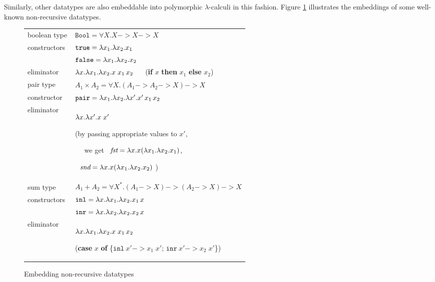 Similarly, other datatypes are also embeddable into
polymorphic $\lambda$-calculi in this fashion.
Figure \ref{fig:churchnonrec} illustrates the embeddings of
some well-known non-recursive datatypes.
\begin{figure}
\begin{tabular}{lp{60mm}}
boolean type	& $\!\!\!\!\mathtt{Bool} = \forall X.X -> X -> X$ \\
constructors		& $\mathtt{true} = \lambda x_1.\lambda x_2. x_1$ \\
            &$\mathtt{false} = \lambda x_1.\lambda x_2. x_2$ \\
eliminator		& $\lambda x.\lambda x_1. \lambda x_2. x\;x_1\,x_2$ \quad~~
	(\textbf{if} $x$ \textbf{then} $x_1$ \textbf{else} $x_2$)\vspace*{1pt}
	\\\hline
	pair type & $\!\!\!\!\!\!\!\!A_1\times A_2 = \forall X. (A_1 -> A_2 -> X) -> X \phantom{A^{A^A}}$ \\
constructor		& $\mathtt{pair} = \lambda x_1.\lambda x_2.\lambda x'.x'\,x_1\,x_2$ \\
eliminator		& $\lambda x.\lambda x'.x\;x'$ \par
			(by passing appropriate values to $x'$, \par ~~ we get
			~$\textit{fst} = \lambda x.x(\lambda x_1.\lambda x_2.x_1)$,\par \qquad
			\quad
			~$\,\textit{snd} = \lambda x.x(\lambda x_1.\lambda x_2.x_2)$ )\vspace*{1pt}
	\\\hline
sum type$\phantom{A^{A^A}}$ & $\!\!\!\!\!\!\!\!A_1+A_2 = \forall X^{*}. (A_1 -> X) -> (A_2 -> X) -> X$ \\
constructors		& $\mathtt{inl} = \lambda x. \lambda x_1. \lambda x_2 . x_1\,x$\\
	      &		$\mathtt{inr} = \lambda x. \lambda x_2. \lambda x_2 . x_2\,x$ \\
eliminator		& $\lambda x.\lambda x_1. \lambda x_2. x\;x_1\,x_2$ \par
			(\textbf{case} $x$ \textbf{of}
				\{$\mathtt{inl}~x' -> x_1\;x'$;
				  $\mathtt{inr}~x' -> x_2\;x'$\})
\end{tabular}
\caption{Embedding non-recursive datatypes}
\label{fig:churchnonrec}
\end{figure}

